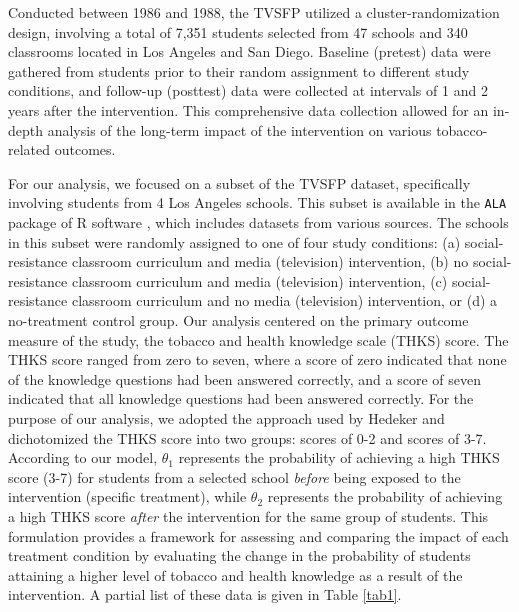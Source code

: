 \documentclass[AMA,Times1COL]{WileyNJDv5} %
\begin{document}
Conducted between 1986 and 1988, the TVSFP utilized a cluster-randomization design, involving a total of 7,351 students selected from 47 schools and 340 classrooms located in Los Angeles and San Diego. Baseline (pretest) data were gathered from students prior to their random assignment to different study conditions, and follow-up (posttest) data were collected at intervals of 1 and 2 years after the intervention. This comprehensive data collection allowed for an in-depth analysis of the long-term impact of the intervention on various tobacco-related outcomes.

For our analysis, we focused on a subset of the TVSFP dataset, specifically involving students from 4 Los Angeles schools. This subset is available in the \texttt{ALA} package \cite{ALA-2011} of R software \cite{R-2024}, which includes datasets from various sources. The schools in this subset were randomly assigned to one of four study conditions: (a) social-resistance classroom curriculum and media (television) intervention, (b) no social-resistance classroom curriculum and media (television) intervention, (c) social-resistance classroom curriculum and no media (television) intervention, or (d) a no-treatment control group.
Our analysis centered on the primary outcome measure of the study, the tobacco and health knowledge scale (THKS) score. The THKS score ranged from zero to seven, where a score of zero indicated that none of the knowledge questions had been answered correctly, and a score of seven indicated that all knowledge questions had been answered correctly. For the purpose of our analysis, we adopted the approach used by Hedeker \cite{Hedeker-1999} and dichotomized the THKS score into two groups: scores of 0-2 and scores of 3-7. According to our model, $\theta_1$ represents the probability of achieving a high THKS score (3-7) for students from a selected school \textit{before }being exposed to the intervention (specific treatment), while $\theta_2$ represents the probability of achieving a high THKS score \textit{after} the intervention for the same group of students. This formulation provides a framework for assessing and comparing the impact of each treatment condition by evaluating the change in the probability of students attaining a higher level of tobacco and health knowledge as a result of the intervention. A partial list of these data is given in Table \ref{tab1}.
\end{document}
